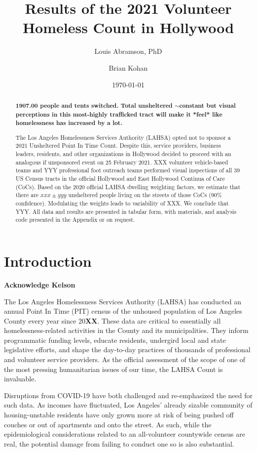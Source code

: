 \documentclass[11pt,twocolumn]{article}
\title{\bf
	Results of the 2021 Volunteer Homeless Count in Hollywood
	}
\author[1,$\ast$,$\dagger$]{Louis Abramson, PhD}%
\author[2]{Brian Kohan}%
\affil[1]{\it \small Hollywood 4WRD Homelessness Coalition, 6255 Sunset Blvd, Ste 150, LA, CA 90028}
\affil[$\ast$]{\it Central Hollywood Neighborhood Council, PO Box 93907, LA, CA 90093}
\affil[$\dagger$]{\it Carnegie Observatories, 813 Santa Barbara St, Pasadena, CA 91101}
\affil[ ]{\href{mailto:labramson@carnegiescience.edu}{labramson@carnegiescience.edu}}
\date{\today}                                           %
\def\bfr{\bf\color{red}}
\begin{document}
\maketitle

\begin{abstract}

{\bfr 1907.00 people and tents switched. Total unsheltered $\sim$constant but visual perceptions
in this most-highly trafficked tract will make it *feel* like homelessness has increased by a lot.}

The Los Angeles Homelessness Services Authority (LAHSA) opted not to sponsor a 2021 Unsheltered 
Point In Time Count. Despite this, service providers, business leaders, residents, and other organizations
in Hollywood decided to proceed with an analogous if unsponsored event on 25 February 2021. XXX 
volunteer vehicle-based teams and YYY professional foot outreach teams performed visual inspections of
all 39 US Census tracts in the official Hollywood and East Hollywood Continua of Care (CoCs). Based on 
the 2020 official LAHSA dwelling weighting factors, we estimate that there are $xxx\pm yyy$ unsheltered 
people living on the streets of those CoCs (90\% confidence). Modulating the weights leads to variability
of XXX. We conclude that YYY. All data and results are presented in tabular form, with materials, and
analysis code presented in the Appendix or on request.

\end{abstract}

\section{Introduction}
\label{sec:intro}

{\bfr Acknowledge Kelson}

The Los Angeles Homelessness Services Authority (LAHSA) has conducted an annual Point In Time (PIT) 
census of the unhoused population of Los Angeles County every year since 20{\bfr XX}. These data are critical to 
essentially all homelessness-related activities in the County and its municipalities. They inform programmatic
funding levels, educate residents, undergird local and state legislative efforts, and shape the day-to-day 
practices of thousands of professional and volunteer service providers. As the official assessment of the 
scope of one of the most pressing humanitarian issues of our time, the LAHSA Count is invaluable.

Disruptions from COVID-19 have both challenged and re-emphasized the need for such data. As incomes 
have fluctuated, Los Angeles' already sizable community of housing-unstable residents have only grown more
at risk of being pushed off couches or out of apartments and onto the street. As such, while the 
epidemiological considerations related to an all-volunteer countywide census are real, the potential 
damage from failing to conduct one so is also substantial.
\end{document}
